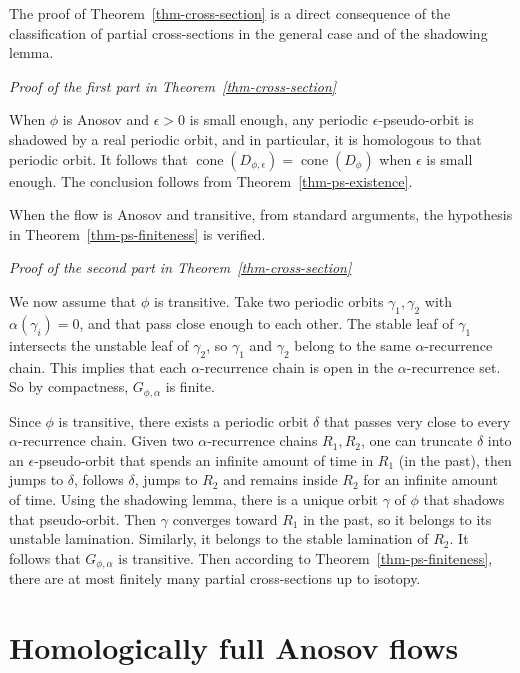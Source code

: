 \documentclass[colorinlistoftodos,12pt]{article}
\makeatletter
\DeclareMathOperator{\cone}{cone}
\theoremstyle{colorplain}
\numberwithin{theorem}{section}
\theoremstyle{colorremarkbis}
\theoremstyle{colorremark}
\theoremstyle{colordefinition}
\renewenvironment{proof}[1][Proof]{
    \setcounter{claim}{0}    
    \setcounter{claimproof}{0}    
    \par
    \pushQED{\qed}%
    \normalfont\topsep6\p@\@plus6\p@\relax
    \trivlist
    \item\relax
    {\itshape\color{RoyalPurple}#1\@addpunct{.}}\hspace\labelsep\ignorespaces
}{%
    \popQED\endtrivlist\@endpefalse
}
\newcounter{claimproof} %
\makeatother
\begin{document}
The proof of Theorem~\ref{thm-cross-section} is a direct consequence of the classification of partial cross-sections in the general case and of the shadowing lemma.

\begin{proof}[Proof of the first part in Theorem~\ref{thm-cross-section}]
	When $\phi$ is Anosov and $\epsilon>0$ is small enough, any periodic $\epsilon$-pseudo-orbit is shadowed by a real periodic orbit, and in particular, it is homologous to that periodic orbit. It follows that $\cone(D_{\phi,\epsilon})=\cone(D_{\phi})$ when $\epsilon$ is small enough. The conclusion follows from Theorem~\ref{thm-ps-existence}.
\end{proof}

When the flow is Anosov and transitive, from standard arguments, the hypothesis in Theorem~\ref{thm-ps-finiteness} is verified. 

\begin{proof}[Proof of the second part in Theorem~\ref{thm-cross-section}]
	We now assume that $\phi$ is transitive. 
	Take two periodic orbits $\gamma_1,\gamma_2$ with $\alpha(\gamma_i)=0$, and that pass close enough to each other. The stable leaf of $\gamma_1$ intersects the unstable leaf of $\gamma_2$, so $\gamma_1$ and $\gamma_2$ belong to the same $\alpha$-recurrence chain. This implies that each $\alpha$-recurrence chain is open in the $\alpha$-recurrence set. So by compactness, $G_{\phi,\alpha}$ is finite.

	Since $\phi$ is transitive, there exists a periodic orbit $\delta$ that passes very close to every $\alpha$-recurrence chain.
	Given two $\alpha$-recurrence chains $R_1,R_2$, one can truncate $\delta$ into an $\epsilon$-pseudo-orbit that spends an infinite amount of time in $R_1$ (in the past), then jumps to $\delta$, follows $\delta$, jumps to $R_2$ and remains inside $R_2$ for an infinite amount of time. Using the shadowing lemma, there is a unique orbit $\gamma$ of $\phi$ that shadows that pseudo-orbit. Then $\gamma$ converges toward $R_1$ in the past, so it belongs to its unstable lamination. Similarly, it belongs to the stable lamination of $R_2$. It follows that $G_{\phi,\alpha}$ is transitive. Then according to Theorem~\ref{thm-ps-finiteness}, there are at most finitely many partial cross-sections up to isotopy.
\end{proof}

\section{Homologically full Anosov flows}\label{sec-hull-homol}
\end{document}
